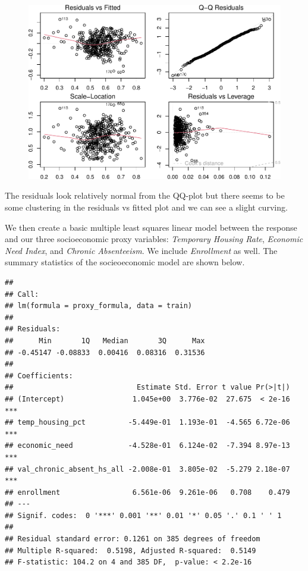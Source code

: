 \documentclass[
  man,floatsintext]{apa6}
\begin{document}
\begin{figure}[H]
\includegraphics[width=\textwidth]{final-project_files/figure-latex/base-model-plot-1} \caption{ }\label{fig:base-model-plot}
\end{figure}

The residuals look relatively normal from the QQ-plot but there seems to be some clustering in the residuals vs fitted plot and we can see a slight curving.

We then create a basic multiple least squares linear model between the response and our three socioeconomic proxy variables: \emph{Temporary Housing Rate}, \emph{Economic Need Index}, and \emph{Chronic Absenteeism}. We include \emph{Enrollment} as well. The summary statistics of the socieoeconomic model are shown below.

\begin{verbatim}
## 
## Call:
## lm(formula = proxy_formula, data = train)
## 
## Residuals:
##      Min       1Q   Median       3Q      Max 
## -0.45147 -0.08833  0.00416  0.08316  0.31536 
## 
## Coefficients:
##                             Estimate Std. Error t value Pr(>|t|)    
## (Intercept)                1.045e+00  3.776e-02  27.675  < 2e-16 ***
## temp_housing_pct          -5.449e-01  1.193e-01  -4.565 6.72e-06 ***
## economic_need             -4.528e-01  6.124e-02  -7.394 8.97e-13 ***
## val_chronic_absent_hs_all -2.008e-01  3.805e-02  -5.279 2.18e-07 ***
## enrollment                 6.561e-06  9.261e-06   0.708    0.479    
## ---
## Signif. codes:  0 '***' 0.001 '**' 0.01 '*' 0.05 '.' 0.1 ' ' 1
## 
## Residual standard error: 0.1261 on 385 degrees of freedom
## Multiple R-squared:  0.5198, Adjusted R-squared:  0.5149 
## F-statistic: 104.2 on 4 and 385 DF,  p-value: < 2.2e-16
\end{verbatim}
\end{document}

